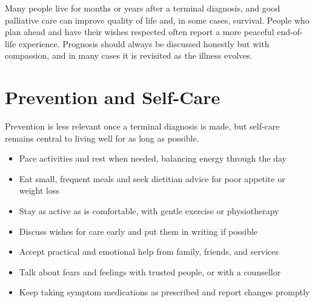 Many people live for months or years after a terminal diagnosis, and good palliative care can improve quality of life and, in some cases, survival. People who plan ahead and have their wishes respected often report a more peaceful end-of-life experience. Prognosis should always be discussed honestly but with compassion, and in many cases it is revisited as the illness evolves.

\section*{Prevention and Self-Care}
Prevention is less relevant once a terminal diagnosis is made, but self-care remains central to living well for as long as possible.

\begin{itemize}
    \item Pace activities and rest when needed, balancing energy through the day
    \item Eat small, frequent meals and seek dietitian advice for poor appetite or weight loss
    \item Stay as active as is comfortable, with gentle exercise or physiotherapy
    \item Discuss wishes for care early and put them in writing if possible
    \item Accept practical and emotional help from family, friends, and services
    \item Talk about fears and feelings with trusted people, or with a counsellor
    \item Keep taking symptom medications as prescribed and report changes promptly
\end{itemize}
